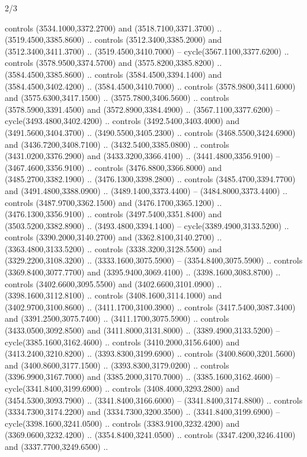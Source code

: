\begin{flagdescription}{2/3}
\begin{scope}[shift={(0.5\flaglength,0.5)},scale=\flagwidth/130]
\begin{scope}[y=0.01mm, x=0.01mm,shift={(-3365,-2250)}]
  controls (3534.1000,3372.2700) and (3518.7100,3371.3700) ..
  (3519.4500,3385.8600) .. controls (3512.3400,3385.2000) and
  (3512.3400,3411.3700) .. (3519.4500,3410.7000) -- cycle(3567.1100,3377.6200)
  .. controls (3578.9500,3374.5700) and (3575.8200,3385.8200) ..
  (3584.4500,3385.8600) .. controls (3584.4500,3394.1400) and
  (3584.4500,3402.4200) .. (3584.4500,3410.7000) .. controls
  (3578.9800,3411.6000) and (3575.6300,3417.1500) .. (3575.7800,3406.5600) ..
  controls (3578.5900,3391.4500) and (3572.8900,3384.4900) ..
  (3567.1100,3377.6200) -- cycle(3493.4800,3402.4200) .. controls
  (3492.5400,3403.4000) and (3491.5600,3404.3700) .. (3490.5500,3405.2300) ..
  controls (3468.5500,3424.6900) and (3436.7200,3408.7100) ..
  (3432.5400,3385.0800) .. controls (3431.0200,3376.2900) and
  (3433.3200,3366.4100) .. (3441.4800,3356.9100) -- (3467.4600,3356.9100) ..
  controls (3476.8800,3366.8000) and (3485.2700,3382.1900) ..
  (3476.1300,3398.2800) .. controls (3485.4700,3394.7700) and
  (3491.4800,3388.0900) .. (3489.1400,3373.4400) -- (3484.8000,3373.4400) ..
  controls (3487.9700,3362.1500) and (3476.1700,3365.1200) ..
  (3476.1300,3356.9100) .. controls (3497.5400,3351.8400) and
  (3503.5200,3382.8900) .. (3493.4800,3394.1400) -- cycle(3389.4900,3133.5200)
  .. controls (3390.2000,3140.2700) and (3362.8100,3140.2700) ..
  (3363.4800,3133.5200) .. controls (3338.3200,3128.5500) and
  (3329.2200,3108.3200) .. (3333.1600,3075.5900) -- (3354.8400,3075.5900) ..
  controls (3369.8400,3077.7700) and (3395.9400,3069.4100) ..
  (3398.1600,3083.8700) .. controls (3402.6600,3095.5500) and
  (3402.6600,3101.0900) .. (3398.1600,3112.8100) .. controls
  (3408.1600,3114.1000) and (3402.9700,3100.8600) .. (3411.1700,3100.3900) ..
  controls (3417.5400,3087.3400) and (3391.2500,3075.7400) ..
  (3411.1700,3075.5900) .. controls (3433.0500,3092.8500) and
  (3411.8000,3131.8000) .. (3389.4900,3133.5200) -- cycle(3385.1600,3162.4600)
  .. controls (3410.2000,3156.6400) and (3413.2400,3210.8200) ..
  (3393.8300,3199.6900) .. controls (3400.8600,3201.5600) and
  (3400.8600,3177.1500) .. (3393.8300,3179.0200) .. controls
  (3396.9900,3167.7000) and (3385.2000,3170.7000) .. (3385.1600,3162.4600) --
  cycle(3341.8400,3199.6900) .. controls (3408.4000,3293.2800) and
  (3454.5300,3093.7900) .. (3341.8400,3166.6000) -- (3341.8400,3174.8800) ..
  controls (3334.7300,3174.2200) and (3334.7300,3200.3500) ..
  (3341.8400,3199.6900) -- cycle(3398.1600,3241.0500) .. controls
  (3383.9100,3232.4200) and (3369.0600,3232.4200) .. (3354.8400,3241.0500) ..
  controls (3347.4200,3246.4100) and (3337.7700,3249.6500) ..

\end{scope}
\end{scope}
\end{flagdescription}
